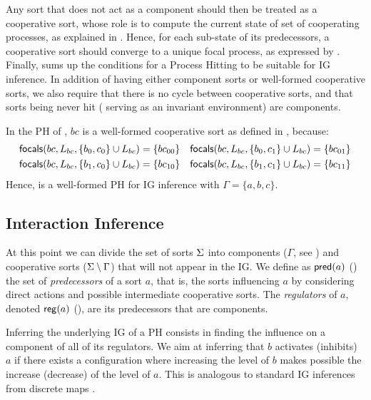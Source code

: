 Any sort that does not act as a component should then be treated as a cooperative sort, whose role is to compute the current state of set of cooperating processes, as explained in .
Hence, for each sub-state of its predecessors, a cooperative sort should converge to a unique focal process, as expressed by .
Finally,  sums up the conditions for a Process Hitting to be suitable for IG inference.
In addition of having either component sorts or well-formed cooperative sorts, we also require that there is no cycle between cooperative sorts, and that sorts being never hit (\ie{} serving as an invariant environment) are components.

\begin{example*}
In the PH of , $bc$ is a well-formed cooperative sort as defined in , because:
\begin{align*}
\mathsf{focals}(bc, L_{bc}, \{b_0, c_0\} \cup L_{bc}) = \{bc_{00}\} && \mathsf{focals}(bc, L_{bc}, \{b_0, c_1\} \cup L_{bc}) = \{bc_{01}\} \\
\mathsf{focals}(bc, L_{bc}, \{b_1, c_0\} \cup L_{bc}) = \{bc_{10}\} && \mathsf{focals}(bc, L_{bc}, \{b_1, c_1\} \cup L_{bc}) = \{bc_{11}\}
\end{align*}
Hence,  is a well-formed PH for IG inference with $\Gamma = \{a,b,c\}$.
\end{example*}



\subsection{Interaction Inference}\label{ssec:infer-IG}

At this point we can divide the set of sorts $\Sigma$ into components ($\Gamma$, see ) and cooperative sorts
($\Sigma \setminus \Gamma$) that will not appear in the IG. 
We define as $\mathsf{pred}(a)$ () the set of \emph{predecessors} of a sort $a$, that is, the sorts influencing $a$
by considering direct actions and possible intermediate cooperative sorts.
The \emph{regulators} of $a$, denoted $\mathsf{reg}({a})$ (), are its predecessors that are components.

Inferring the underlying IG of a PH consists in finding the influence on a component of all of its regulators.
We aim at inferring that $b$ activates (inhibits) $a$ if there exists a configuration where increasing the level of $b$ makes possible the increase (decrease) of the level of $a$.
This is analogous to standard IG inferences from discrete maps \cite{RiCo07}.

